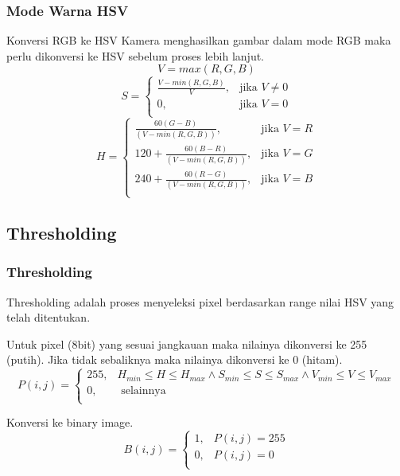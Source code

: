 \documentclass[table,dvipsnames]{beamer}
\begin{document}
\begin{frame}
\frametitle{Mode Warna HSV}
\begin{block}{Konversi RGB ke HSV}
Kamera menghasilkan gambar dalam mode RGB maka perlu dikonversi ke HSV sebelum proses lebih lanjut.
\begin{equation}
  V = max(R,G,B)
\end{equation}
\begin{equation}
  S =  
  \begin{cases}
      \frac{V-min(R,G,B)}{V},& \text{jika } V\neq 0\\
      0,              & \text{jika } V = 0\\
  \end{cases}
\end{equation}
\begin{equation}
  H =  
  \begin{cases}
      \frac{60(G-B)}{(V-min(R,G,B))},& \text{jika } V = R\\
      120 + \frac{60(B-R)}{(V-min(R,G,B))},& \text{jika } V = G\\
      240 + \frac{60(R-G)}{(V-min(R,G,B))},& \text{jika } V = B\\
  \end{cases}
\end{equation}
\end{block}
\end{frame}

\subsection{Thresholding}

\begin{frame}
\frametitle{Thresholding}
\begin{block}{}
Thresholding adalah proses menyeleksi pixel berdasarkan range nilai HSV yang telah ditentukan.
\end{block}
\begin{block}{}
Untuk pixel (8bit) yang sesuai jangkauan maka nilainya dikonversi ke 255 (putih).
Jika tidak sebaliknya maka nilainya dikonversi ke 0 (hitam).
\begin{equation}
  P(i,j) =  
  \begin{cases}
      255,& H_{min} \leq H\leq H_{max} \land S_{min} \leq S\leq S_{max} \land V_{min} \leq V\leq V_{max}\\
      0,              & \text{ selainnya } \\
  \end{cases}
\end{equation}
\end{block}
\begin{block}{}
Konversi ke binary image.
\begin{equation}
  B(i,j) =  
  \begin{cases}
      1,& P(i,j)=255\\
      0,& P(i,j)=0 \\
  \end{cases}
\end{equation}
\end{block}
\end{frame}
\end{document}
